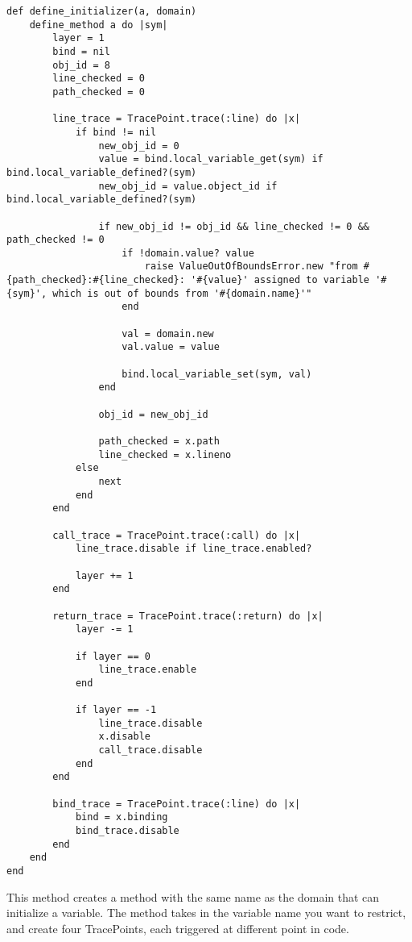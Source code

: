 \begin{lstlisting}[caption={Method for defining the initializer method}]
def define_initializer(a, domain)
    define_method a do |sym|
        layer = 1
        bind = nil
        obj_id = 8
        line_checked = 0
        path_checked = 0

        line_trace = TracePoint.trace(:line) do |x|
            if bind != nil
                new_obj_id = 0
                value = bind.local_variable_get(sym) if bind.local_variable_defined?(sym)
                new_obj_id = value.object_id if bind.local_variable_defined?(sym)

                if new_obj_id != obj_id && line_checked != 0 && path_checked != 0
                    if !domain.value? value
                        raise ValueOutOfBoundsError.new "from #{path_checked}:#{line_checked}: '#{value}' assigned to variable '#{sym}', which is out of bounds from '#{domain.name}'"
                    end

                    val = domain.new
                    val.value = value

                    bind.local_variable_set(sym, val)
                end

                obj_id = new_obj_id

                path_checked = x.path
                line_checked = x.lineno
            else
                next
            end
        end

        call_trace = TracePoint.trace(:call) do |x|
            line_trace.disable if line_trace.enabled?

            layer += 1
        end

        return_trace = TracePoint.trace(:return) do |x|
            layer -= 1

            if layer == 0
                line_trace.enable
            end

            if layer == -1
                line_trace.disable
                x.disable
                call_trace.disable
            end
        end

        bind_trace = TracePoint.trace(:line) do |x|
            bind = x.binding
            bind_trace.disable
        end
    end
end
\end{lstlisting}

This method creates a method with the same name as the domain that can initialize a variable.  The method takes in the variable name you want to restrict, and create four TracePoints, each triggered at different point in code.

